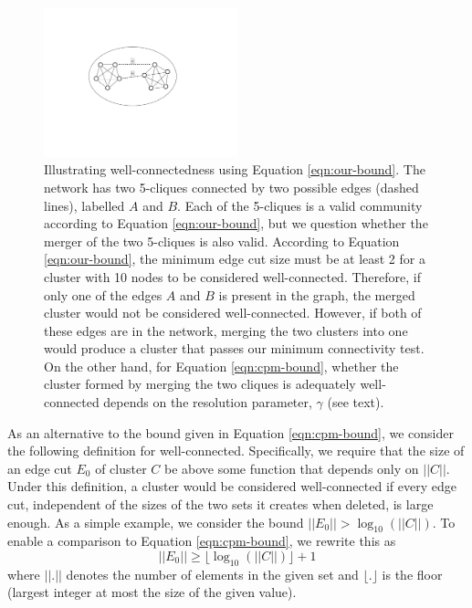 \documentclass[11pt]{article}   	%
\begin{document}
\begin{figure}[h!]
\centering
\includegraphics[width=0.5\textwidth]{figs/fig_clique.pdf}
\caption{Illustrating well-connectedness using Equation \ref{eqn:our-bound}. The network has two 5-cliques connected by two possible edges (dashed lines), labelled $A$ and $B$.
Each of the 5-cliques is a valid community according to Equation \ref{eqn:our-bound}, but we question whether the merger of the two 5-cliques is also valid.
According to Equation \ref{eqn:our-bound}, the minimum edge cut size  must be at least 2 for a cluster with 10 nodes to be considered well-connected.
Therefore, if only one of the edges $A$ and $B$ is present in the graph, the merged cluster  would not  be considered well-connected.
However, if both of these edges are in the network, merging the two clusters into one would produce a cluster that passes our minimum connectivity test.
On the other hand, for Equation \ref{eqn:cpm-bound}, whether the cluster formed by merging the two cliques is adequately well-connected depends on the resolution parameter, $\gamma$ (see text).}
\label{fig:2cliques}
\end{figure}

As an alternative to the bound given in Equation \ref{eqn:cpm-bound},  we consider the
following definition for well-connected.
Specifically, we require that the size of an edge cut  $E_0$  of cluster $C$ be above some function that depends only on $||C||$.
Under this definition, a cluster would be considered well-connected if every edge cut, independent of the sizes of the
two sets it creates when deleted, is large enough.
As a simple example, we consider the bound $||E_0|| > \log_{10}(||C||)$.  To enable a comparison to Equation \ref{eqn:cpm-bound}, we rewrite this  as
\begin{equation}
  ||E_0|| \geq  \lfloor \log_{10}(||C||) \rfloor +1
  \label{eqn:our-bound}
  \end{equation}
where $||.||$ denotes the number of elements in the given set and
$\lfloor . \rfloor$ is the floor (largest integer at most the size of the given value).
\end{document}
